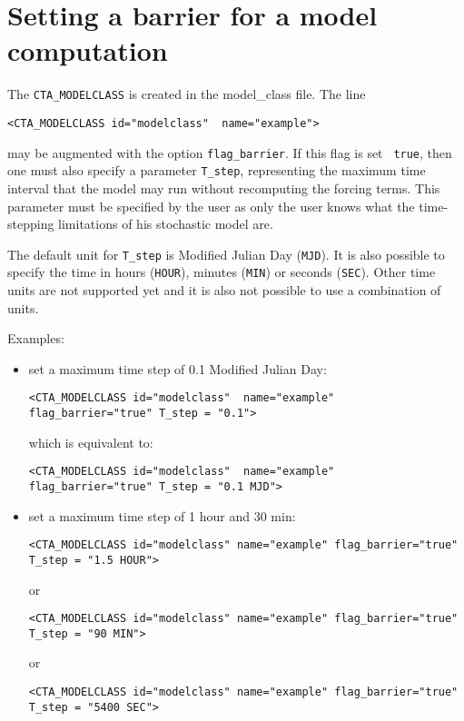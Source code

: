 \documentclass[12pt]{article}
\begin{document}
\section{Setting a barrier for a model computation}

The {\tt CTA\_MODELCLASS} is created in the model\_class file. The line
\begin{verbatim}
<CTA_MODELCLASS id="modelclass"  name="example">
\end{verbatim}
may be augmented with the option {\tt flag\_barrier}. If this flag is set {\tt
  true}, then one must also specify a parameter {\tt T\_step}, representing the
maximum time interval that the model may run without recomputing the forcing
terms. This parameter must be specified by the user as only the user knows what
the time-stepping limitations of his stochastic model are.

The default unit for {\tt T\_step} is Modified Julian Day ({\tt MJD}). It is
also possible to specify the time in hours ({\tt HOUR}), minutes ({\tt MIN}) or
seconds ({\tt SEC}). Other time units are not supported yet and it is also not
possible to use a combination of units.

Examples:
\begin{itemize}
\item set a maximum time step of 0.1 Modified Julian Day:
\begin{verbatim}
<CTA_MODELCLASS id="modelclass"  name="example"
flag_barrier="true" T_step = "0.1">
\end{verbatim}
which is equivalent to:
\begin{verbatim}
<CTA_MODELCLASS id="modelclass"  name="example"
flag_barrier="true" T_step = "0.1 MJD">
\end{verbatim}

\item set a maximum time step of 1 hour and 30 min:
\begin{verbatim}
<CTA_MODELCLASS id="modelclass" name="example" flag_barrier="true"
T_step = "1.5 HOUR">
\end{verbatim}
or
\begin{verbatim}
<CTA_MODELCLASS id="modelclass" name="example" flag_barrier="true"
T_step = "90 MIN">
\end{verbatim}
or 
\begin{verbatim}
<CTA_MODELCLASS id="modelclass" name="example" flag_barrier="true"
T_step = "5400 SEC">
\end{verbatim}
\end{itemize}
\end{document}
